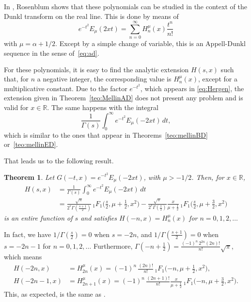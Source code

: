 \documentclass[a4paper]{amsart}
\newcommand{\R}{\mathbb{R}}
\theoremstyle{plain}
\newtheorem{theorem}{Theorem}[section]
\theoremstyle{definition}
\theoremstyle{remark}
\numberwithin{equation}{section}
\begin{document}
In \cite{Ros}, Rosenblum shows that these polynomials can be studied in the context of the Dunkl transform on the real line. This is done by means of 
\begin{equation}
\label{eq:Hergen}
e^{-t^2}E_{\mu}(2xt) = \sum_{n=0}^{\infty} H_{n}^{\mu}(x)\frac{t^n}{n!}
\end{equation}
with $\mu = \alpha + 1/2$. Except by a simple change of variable, this is an Appell-Dunkl sequence in the sense of~\eqref{eq:ad}.

For these polynomials, it is easy to find the analytic extension $H(s, x)$ such that, for $n$ a negative integer, the corresponding value is $H_{n}^{\mu}(x)$, except for a multiplicative constant. Due to the factor $e^{-t^2}$, which appears in \eqref{eq:Hergen},  
the extension given in Theorem~\ref{teo:MellinAD} does not present any problem and is valid for $x\in\R$. The same happens with the integral 
\[
  \frac{1}{\Gamma(s)} \int_{0}^{\infty} e^{-t^2}E_{\mu}(-2xt) \,dt,
\]
which is similar to the ones that appear in Theorems~\ref{teo:mellinBD} or~\ref{teo:mellinED}.

That leads us to the following result.

\begin{theorem}
Let $G(-t,x) = e^{-t^2}E_{\mu}(-2xt)$, with $\mu>-1/2$. Then, for $x \in \R$,
\begin{align*}
H(s,x) & = \frac{1}{\Gamma(s)} \int_{0}^{\infty} e^{-t^2}E_{\mu}(-2xt) \,dt \\
& = \frac{\sqrt{\pi}}{2^s\Gamma(\frac{s+1}{2})}
\,{}_1F_1\Big(\frac{s}{2},\mu+\frac{1}{2},x^2\Big) 
- \frac{\sqrt{\pi}}{2^s\Gamma(\frac{s}{2})} \frac{x}{\mu+\frac{1}{2}}
\,{}_1F_1\Big(\frac{s}{2},\mu+\frac{3}{2},x^2\Big)
\end{align*}
is an entire function of $s$ and satisfies $H(-n,x) = H_{n}^{\mu}(x)$ for $n=0,1,2,\dots$
\end{theorem}

In fact, we have $1/\Gamma(\frac{s}{2})=0$ when $s=-2n$, and $1/\Gamma(\frac{s+1}{2})=0$ when $s=-2n-1$ for $n=0,1,2,\dots$ 
Furthermore, $\Gamma(-n+\frac{1}{2}) 
= \frac{(-1)^n \, 2^{2n}(2n)!}{n!}\sqrt{\pi}$, which means
\begin{align*}
H(-2n,x) & = H_{2n}^{\mu}(x) 
= (-1)^n \, \frac{(2n)!}{n!} \,{}_1F_1\Big({-n},\mu+\frac{1}{2},x^2\Big), 
\\
H(-2n-1,x) & = H_{2n+1}^{\mu}(x) 
= (-1)^n \, \frac{(2n+1)!}{n!} 
\frac{x}{\mu+\frac{1}{2}} \,{}_1F_1\Big({-n},\mu+\frac{3}{2},x^2\Big) .
\end{align*}
This, as expected, is the same as \cite[(2.1.1) and (2.2.1)]{Ros}.
\end{document}
